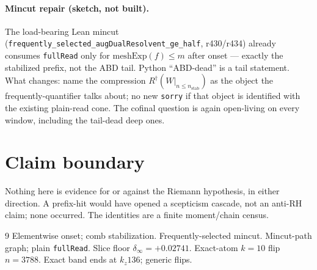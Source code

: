 \documentclass[11pt]{article}
\begin{document}
\paragraph{Mincut repair (sketch, not built).}
The load-bearing Lean mincut
(\texttt{frequently\_selected\_augDualResolvent\_ge\_half},
r430/r434) already consumes
\texttt{fullRead} only for
$\mathrm{meshExp}(f)\le m$ after onset ---
exactly the stabilized prefix, not the ABD
tail.  Python ``ABD-dead'' is a tail statement.
What changes: name the compression
$R^{\dagger}(W|_{n\le n_{\mathrm{stab}}})$
as the object the frequently-quantifier
talks about; no new \texttt{sorry} if that
object is identified with the existing
plain-read cone.  The cofinal question is
again open-living on every window, including
the tail-dead deep ones.

\section*{Claim boundary}

Nothing here is evidence for or against the
Riemann hypothesis, in either direction.
A prefix-hit would have opened a scepticism
cascade, not an anti-RH claim; none occurred.
The identities are a finite moment/chain census.

\begin{thebibliography}{9}
 Elementwise onset; comb stabilization.
 Frequently-selected mincut.
 Mincut-path graph; plain \texttt{fullRead}.
 Slice floor $\delta_\infty=+0.02741$.
 Exact-atom $k=10$ flip $n=3788$.
 Exact band ends at $k_z136$; generic flips.
\end{thebibliography}
\end{document}
